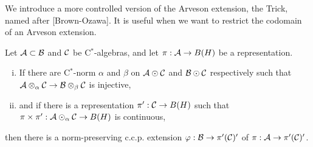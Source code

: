 \documentclass{../../../small}
\begin{document}
We introduce a  more controlled version of the Arveson extension, the Trick, named after [Brown-Ozawa].
It is useful when we want to restrict the codomain of an Arveson extension.
\begin{thm}
Let $\mathcal{A}\subset\mathcal{B}$ and $\mathcal{C}$ be C$^*$-algebras, and let $\pi:\mathcal{A}\to B(H)$ be a representation.
\begin{enumerate}[(i)]
\item If there are C$^*$-norm $\alpha$ and $\beta$ on $\mathcal{A}\odot\mathcal{C}$ and $\mathcal{B}\odot\mathcal{C}$ respectively such that $\mathcal{A}\otimes_\alpha\mathcal{C}\to\mathcal{B}\otimes_\beta\mathcal{C}$ is injective,
\item and if there is a representation $\pi':\mathcal{C}\to B(H)$ such that $\pi\times\pi':\mathcal{A}\odot_\alpha\mathcal{C}\to B(H)$ is continuous,
\end{enumerate}
then there is a norm-preserving c.c.p. extension $\varphi:\mathcal{B}\to\pi'(\mathcal{C})'$ of $\pi:\mathcal{A}\to\pi'(\mathcal{C})'$.
\end{thm}
\end{document}
